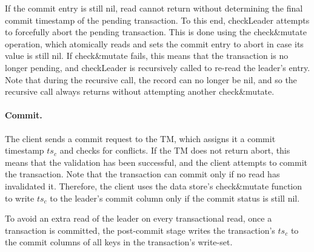 If the commit entry is still nil, read cannot return without determining the final commit timestamp
of the pending transaction. 
To this end, {\sc checkLeader} attempts to forcefully abort the pending transaction. This is done using the
 {check\&mutate} operation, which atomically reads and sets the commit entry to abort in case its value is still nil.
If check\&mutate fails, this means that the transaction is no longer pending, and {\sc checkLeader} is recursively called
to re-read the leader's entry. Note that during the recursive call, the record can no longer be nil, and so the recursive call 
always returns without attempting another check\&mutate.
 


\paragraph{Commit.}
The client sends a commit request to the TM, which assigns it a commit timestamp $ts_c$ and checks for conflicts. 
If the TM does not return abort, this means that the validation has been successful, and the client 
attempts to commit the transaction. 
Note that the transaction can commit only if no read has invalidated it. Therefore, the client uses 
the data store's check\&mutate function to write $ts_c$ to the leader's commit column 
only if the commit status is still nil.

To avoid an extra read of the leader on every transactional read, once a transaction is committed, the post-commit stage writes 
the transaction's $ts_c$ to the commit columns of all keys in  the transaction's write-set. 


